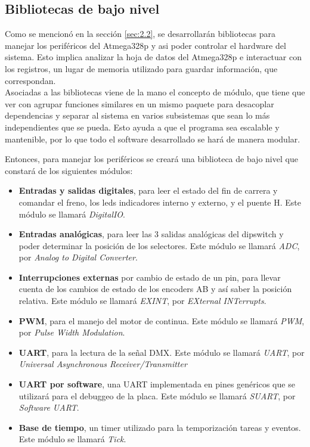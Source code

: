 \subsection{Bibliotecas de bajo nivel}
Como se mencionó en la sección \ref{sec:2.2}, se desarrollarán bibliotecas para manejar los periféricos del Atmega328p y asi poder controlar el hardware del sistema. Esto implica analizar la hoja de datos del Atmega328p \cite{sec2_6_2-2} e interactuar con los registros, un lugar de memoria utilizado para guardar información, que correspondan.\\ 
Asociadas a las bibliotecas viene de la mano el concepto de módulo, que tiene que ver con agrupar funciones similares en un mismo paquete para desacoplar dependencias y separar al sistema en varios subsistemas que sean lo más independientes que se pueda. Esto ayuda a que el programa sea escalable y mantenible, por lo que todo el software desarrollado se hará de manera modular.

Entonces, para manejar los periféricos se creará una biblioteca de bajo nivel que constará de los siguientes módulos:
\begin{itemize}
	\item \textbf{Entradas y salidas digitales}, para leer el estado del fin de carrera y comandar el freno, los leds indicadores interno y externo, y el puente H. Este módulo se llamará \textit{DigitalIO}.
	\item \textbf{Entradas analógicas}, para leer las 3 salidas analógicas del dipswitch y poder determinar la posición de los selectores. Este módulo se llamará \textit{ADC}, por \textit{Analog to Digital Converter}.
	\item \textbf{Interrupciones externas} por cambio de estado de un pin, para llevar cuenta de los cambios de estado de los encoders AB y así saber la posición relativa. Este módulo se llamará \textit{EXINT}, por \textit{EXternal INTerrupts}.
	\item \textbf{PWM}, para el manejo del motor de continua. Este módulo se llamará \textit{PWM}, por \textit{Pulse Width Modulation}.
	\item \textbf{UART}, para la lectura de la señal DMX. Este módulo se llamará \textit{UART}, por \textit{Universal Asynchronous Receiver/Transmitter}
	\item \textbf{UART por software}, una UART implementada en pines genéricos que se utilizará para el debuggeo de la placa. Este módulo se llamará \textit{SUART}, por \textit{Software UART}.
	\item \textbf{Base de tiempo}, un timer utilizado para la temporización tareas y eventos. Este módulo se llamará \textit{Tick}.
\end{itemize}

